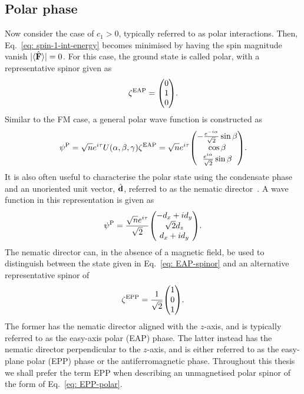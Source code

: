 \subsection{Polar phase}
Now consider the case of \(c_1 > 0\), typically referred to as polar
interactions.
Then, Eq.~\eqref{eq: spin-1-int-energy} becomes minimised by having the spin
magnitude vanish \(|\langle \hat{\vb{F}} \rangle |=0\).
For this case, the ground state is called polar, with a representative
spinor given as
\begin{equation}\label{eq: EAP-spinor}
    \zeta^\mathrm{EAP} = \mqty(0 \\ 1 \\ 0).
\end{equation}
Similar to the FM case, a general polar wave function is constructed as
\begin{equation}\label{eq: polar-representative-spinor}
    \psi^\mathrm{P} =
    \sqrt{n}e^{i\tau}U(\alpha, \beta, \gamma)\zeta^\mathrm{EAP} =
    \sqrt{n}e^{i\tau}\mqty(
    -\frac{e^{-i\alpha}}{\sqrt{2}}\sin\beta \\
    \cos\beta \\
    \frac{e^{i\alpha}}{\sqrt{2}}\sin\beta
    ).
\end{equation}
It is also often useful to characterise the polar state using the condensate
phase and an unoriented unit vector, \(\hat{\vb{d}}\), referred to as the
nematic director~\cite{Ruostekoski2003}.
A wave function in this representation is given as
\begin{align}
    \psi^\mathrm{P} = \frac{\sqrt{n}e^{i\tau}}{\sqrt{2}}
    \mqty(-d_x + id_y \\ \sqrt{2}d_z \\ d_x + id_y).
\end{align}
The nematic director can, in the absence of a magnetic field, be used to
distinguish between the state given in Eq.~\eqref{eq: EAP-spinor} and an
alternative representative spinor of
\begin{align}\label{eq: EPP-polar}
    \zeta^\text{EPP} = \frac{1}{\sqrt{2}}\mqty(1 \\ 0 \\ 1).
\end{align}
The former has the nematic director aligned with the \(z\)-axis, and is
typically referred to as the easy-axis polar (EAP) phase.
The latter instead has the nematic director perpendicular to the \(z\)-axis,
and is either referred to as the easy-plane polar (EPP) phase or the
antiferromagnetic phase.
Throughout this thesis we shall prefer the term EPP when describing an
unmagnetised polar spinor of the form of Eq.~\eqref{eq: EPP-polar}.


